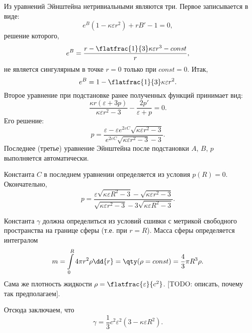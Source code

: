 \documentclass[\docroot/reports/draft/report.tex]{subfiles}
\begin{document}
    Из уравнений Эйнштейна нетривиальными являются три. Первое записывается в виде:
    \begin{equation}
        e^B (1 - \kappa \varepsilon r^2) + r B' - 1 = 0 ,
    \end{equation}
    решение которого,
    \begin{equation*}
        e^{B} = \frac{r - \flatfrac{1}{3} \kappa \varepsilon r^3 - const}{r} ,
    \end{equation*}
    не является сингулярным в точке $r = 0$ только при $const = 0$. Итак,
    \begin{equation*}
        e^{B} = 1 - \flatfrac{1}{3} \kappa \varepsilon r^2 .
    \end{equation*}
    Второе уравнение при подстановке ранее полученных функций принимает вид:
    \begin{equation}
        \frac{\kappa r (\varepsilon + 3 p)}{\kappa \varepsilon r^2 - 3} - \frac{2 p'}{\varepsilon + p} = 0 .
    \end{equation}
    Его решение:
    \begin{equation}
        p = \frac{\varepsilon - \varepsilon e^{2 \varepsilon C} \sqrt{\kappa \varepsilon r^2 - 3}}{e^{2 \varepsilon C} \sqrt{\kappa \varepsilon r^2 - 3} - 3} .
    \end{equation}
    Последнее (третье) уравнение Эйнштейна после подстановки $A$, $B$, $p$ выполняется автоматически.

    Константа $C$ в последнем уравнении определяется из условия $p(R) = 0$. Окончательно,
    \begin{equation}
        p = \frac{\varepsilon \sqrt{\kappa \varepsilon R^2 - 3} - \sqrt{\kappa \varepsilon r^2 - 3}}{
            \sqrt{\kappa \varepsilon r^2 - 3} - 3 \sqrt{\kappa \varepsilon R^2 - 3}} .
    \end{equation}

    Константа $\gamma$ должна определиться из условий сшивки с метрикой свободного пространства на границе сферы (т.е. при $r = R$). Масса сферы определяется интегралом
    \begin{equation*}
        m = \int\limits_0^R 4 \pi r^2 \rho \dd{r} = \qty( \rho = const ) = \frac{4}{3} \pi R^3 \rho .
    \end{equation*}
    Сама же плотность жидкости $\rho = \flatfrac{\varepsilon}{c^2}$. [TODO: описать, почему так предполагаем].

    Отсюда заключаем, что
    \begin{equation}
        \gamma = \frac{1}{3} c^2 \varepsilon^2 (3 - \kappa \varepsilon R^2) .
    \end{equation}
\end{document}
